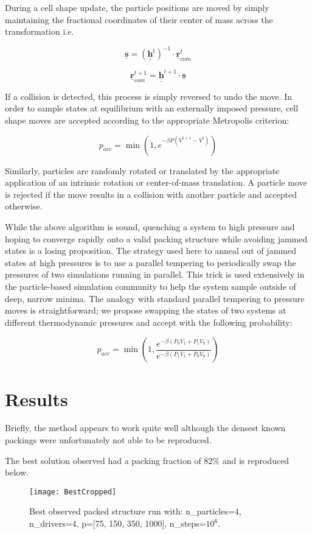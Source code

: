 \documentclass[12pt,a4paper]{article}
\begin{document}
During a cell shape update, the particle positions are moved by simply maintaining the fractional coordinates of their center of mass across the transformation i.e.

$$\underline{\mathbf{s}} = \left(\underline{\underline{\mathbf{h}}}^{t}\right)^{-1} \cdot \underline{\mathbf{r}}_{com}^t $$

$$\underline{\mathbf{r}}_{com}^{t+1} = \underline{\underline{\mathbf{h}}}^{t+1} \cdot \underline{\mathbf{s}} $$

If a collision is detected, this process is simply reversed to undo the move. In order to sample states at equilibrium with an externally imposed pressure, cell shape moves are accepted according to the appropriate Metropolis criterion:

$$ p_{acc} = \min\left(1, e^{-\beta P\left(V^{t+1} - V^{t}\right)} \right)$$

Similarly, particles are randomly rotated or translated by the appropriate application of an intrinsic rotation or center-of-mass translation. A particle move is rejected if the move results in a collision with another particle and accepted otherwise.

While the above algorithm is sound, quenching a system to high pressure and hoping to converge rapidly onto a valid packing structure while avoiding jammed states is a losing proposition. The strategy used here to anneal out of jammed states at high pressures is to use a parallel tempering to periodically swap the pressures of two simulations running in parallel. This trick is used extensively in the particle-based simulation community to help the system sample outside of deep, narrow minima. The analogy with standard parallel tempering to pressure moves is straightforward; we propose swapping the states of two systems at different thermodynamic pressures and accept with the following probability:

$$ p_{acc} = \min\left(1, \frac{e^{-\beta \left(P_0 V_1 + P_1 V_0\right)}}{e^{-\beta \left(P_1 V_1 + P_0 V_0\right)}}\right)$$

\section*{Results}

Briefly, the method appears to work quite well although the densest known packings were unfortunately not able to be reproduced. 

The best solution observed had a packing fraction of 82\% and is reproduced below.

\begin{figure}[h!]
\begin{center}
	\texttt{[image: BestCropped]}
\end{center}
\caption{Best observed packed structure run with: n{\_}particles=4, n{\_}drivers=4, p=$[$75, 150, 350, 1000$]$, n{\_}steps=$10^6$.}
\end{figure}
\end{document}
